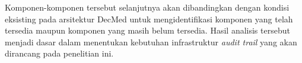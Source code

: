 Komponen-komponen tersebut selanjutnya akan dibandingkan dengan kondisi eksisting pada arsitektur DecMed untuk mengidentifikasi komponen yang telah tersedia maupun komponen yang masih belum tersedia. Hasil analisis tersebut menjadi dasar dalam menentukan kebutuhan infrastruktur \textit{audit trail} yang akan dirancang pada penelitian ini.